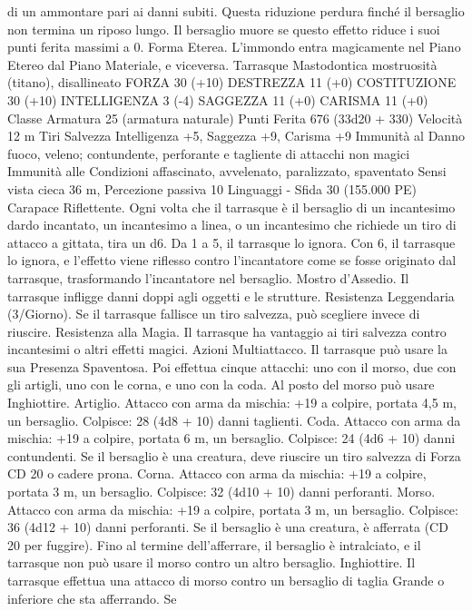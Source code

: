\begin{multicols}{2}
di un ammontare pari ai danni subiti. Questa riduzione perdura
finché il bersaglio non termina un riposo lungo. Il bersaglio
muore se questo effetto riduce i suoi punti ferita massimi a 0.
Forma Eterea. L’immondo entra magicamente nel Piano Etereo
dal Piano Materiale, e viceversa.
Tarrasque
Mastodontica mostruosità (titano), disallineato
FORZA 30 (+10)
DESTREZZA 11 (+0)
COSTITUZIONE 30 (+10)
INTELLIGENZA 3 (-4)
SAGGEZZA 11 (+0)
CARISMA 11 (+0)
Classe Armatura 25 (armatura naturale)
Punti Ferita 676 (33d20 + 330)
Velocità 12 m
Tiri Salvezza Intelligenza +5, Saggezza +9, Carisma +9
Immunità al Danno fuoco, veleno; contundente, perforante e
tagliente di attacchi non magici
Immunità alle Condizioni affascinato, avvelenato, paralizzato,
spaventato
Sensi vista cieca 36 m, Percezione passiva 10
Linguaggi -
Sfida 30 (155.000 PE)
Carapace Riflettente. Ogni volta che il tarrasque è il bersaglio di
un incantesimo dardo incantato, un incantesimo a linea, o un
incantesimo che richiede un tiro di attacco a gittata, tira un d6.
Da 1 a 5, il tarrasque lo ignora. Con 6, il tarrasque lo ignora, e
l’effetto viene riflesso contro l’incantatore come se fosse
originato dal tarrasque, trasformando l’incantatore nel bersaglio.
Mostro d’Assedio. Il tarrasque infligge danni doppi agli oggetti e
le strutture.
Resistenza Leggendaria (3/Giorno). Se il tarrasque fallisce un
tiro salvezza, può scegliere invece di riuscire.
Resistenza alla Magia. Il tarrasque ha vantaggio ai tiri salvezza
contro incantesimi o altri effetti magici.
Azioni
Multiattacco. Il tarrasque può usare la sua Presenza Spaventosa.
Poi effettua cinque attacchi: uno con il morso, due con gli artigli,
uno con le corna, e uno con la coda. Al posto del morso può
usare Inghiottire.
Artiglio. Attacco con arma da mischia: +19 a colpire, portata 4,5
m, un bersaglio.
Colpisce: 28 (4d8 + 10) danni taglienti.
Coda. Attacco con arma da mischia: +19 a colpire, portata 6 m,
un bersaglio.
Colpisce: 24 (4d6 + 10) danni contundenti. Se il bersaglio è una
creatura, deve riuscire un tiro salvezza di Forza CD 20 o cadere
prona.
Corna. Attacco con arma da mischia: +19 a colpire, portata 3 m,
un bersaglio.
Colpisce: 32 (4d10 + 10) danni perforanti.
Morso. Attacco con arma da mischia: +19 a colpire, portata 3 m,
un bersaglio.
Colpisce: 36 (4d12 + 10) danni perforanti. Se il bersaglio è una
creatura, è afferrata (CD 20 per fuggire). Fino al termine
dell’afferrare, il bersaglio è intralciato, e il tarrasque non può
usare il morso contro un altro bersaglio.
Inghiottire. Il tarrasque effettua una attacco di morso contro un
bersaglio di taglia Grande o inferiore che sta afferrando. Se

\end{multicols}
